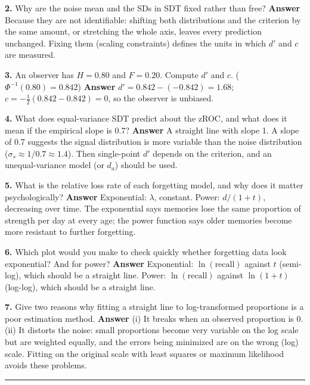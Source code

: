 \textbf{2.} Why are the noise mean and the SDs in SDT fixed rather than
free? \textbf{Answer} Because they are not identifiable: shifting both
distributions and the criterion by the same amount, or stretching the
whole axis, leaves every prediction unchanged. Fixing them (scaling
constraints) defines the units in which \(d'\) and \(c\) are measured.

\textbf{3.} An observer has \(H = 0.80\) and \(F = 0.20\). Compute
\(d'\) and \(c\). (\(\Phi^{-1}(0.80) = 0.842\)) \textbf{Answer}
\(d' = 0.842 - (-0.842) = 1.68\);
\(c = -\tfrac{1}{2}(0.842 - 0.842) = 0\), so the observer is unbiased.

\textbf{4.} What does equal-variance SDT predict about the zROC, and
what does it mean if the empirical slope is 0.7? \textbf{Answer} A
straight line with slope 1. A slope of 0.7 suggests the signal
distribution is more variable than the noise distribution
(\(\sigma_s \approx 1/0.7 \approx 1.4\)). Then single-point \(d'\)
depends on the criterion, and an unequal-variance model (or \(d_a\))
should be used.

\textbf{5.} What is the relative loss rate of each forgetting model, and
why does it matter psychologically? \textbf{Answer} Exponential:
\(\lambda\), constant. Power: \(d/(1+t)\), decreasing over time. The
exponential says memories lose the same proportion of strength per day
at every age; the power function says older memories become more
resistant to further forgetting.

\textbf{6.} Which plot would you make to check quickly whether
forgetting data look exponential? And for power? \textbf{Answer}
Exponential: \(\ln(\text{recall})\) against \(t\) (semi-log), which
should be a straight line. Power: \(\ln(\text{recall})\) against
\(\ln(1+t)\) (log-log), which should be a straight line.

\textbf{7.} Give two reasons why fitting a straight line to
log-transformed proportions is a poor estimation method. \textbf{Answer}
(i) It breaks when an observed proportion is 0. (ii) It distorts the
noise: small proportions become very variable on the log scale but are
weighted equally, and the errors being minimized are on the wrong (log)
scale. Fitting on the original scale with least squares or maximum
likelihood avoids these problems.

\begin{center}\rule{0.5\linewidth}{0.5pt}\end{center}


